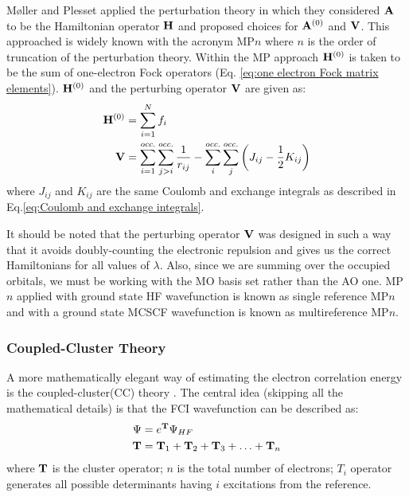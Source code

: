                 M\o{}ller and Plesset \cite{Moller1934} applied the perturbation theory in which they considered ${\mathbf {A}}$ to be the Hamiltonian operator ${\mathbf {H}}$ and proposed choices for ${\mathbf {A}}^{(0)}$ and ${\mathbf {V}}$. This approached is widely known with the acronym MP$n$ where $n$ is the order of truncation of the perturbation theory. Within the MP approach ${\mathbf {H}}^{(0)}$ is taken to be the sum of one-electron Fock operators (Eq. \eqref{eq:one electron Fock matrix elements}). ${\mathbf {H}}^{(0)}$ and the perturbing operator ${\mathbf {V}}$ are given as:
                \begin{equation}\label{eq:MP elements}
                    \begin{aligned}
                        {\mathbf {H}}^{(0)} &= \displaystyle\sum_{i=1}^N f_i\\
                        {\mathbf {V}} &= \displaystyle\sum_{i=1}^{occ.} \displaystyle\sum_{j > i}^{occ.} \frac{1}{r_{ij}} - \displaystyle\sum_{i}^{occ.} \displaystyle\sum_{j}^{occ.} \left (J_{ij} - \frac{1}{2} K_{ij} \right)
                    \end{aligned}
                \end{equation}
                where $J_{ij}$ and $K_{ij}$ are the same Coulomb and exchange integrals as described in Eq.\eqref{eq:Coulomb and exchange integrals}.

                It should be noted that the perturbing operator ${\mathbf {V}}$ was designed in such a way that it avoids doubly-counting the electronic repulsion and gives us the correct Hamiltonians for all values of $\lambda$. Also, since we are summing over the occupied orbitals, we must be working with the MO basis set rather than the AO one. MP$n$ applied with ground state HF wavefunction is known as single reference MP$n$ and with a ground state MCSCF wavefunction is known as multireference MP$n$.

            \subsubsection{Coupled-Cluster Theory}\label{subsubsec:coupled-cluster theory}
                A more mathematically elegant way of estimating the electron correlation energy is the coupled-cluster(CC) theory \cite{Cizek1966}. The central idea (skipping all the mathematical details) is that the FCI wavefunction can be described as:
                \begin{equation}\label{eq:cc}
                    \begin{aligned}
                        \Psi &= e^{\mathbf {T}} \Psi_{HF}\\
                        {\mathbf {T}} &= {\mathbf {T}}_1 + {\mathbf {T}}_2 + {\mathbf {T}}_3 + \ldots + {\mathbf {T}}_n
                    \end{aligned}
                \end{equation}
                where ${\mathbf {T}}$ is the cluster operator; $n$ is the total number of electrons; $T_i$ operator generates all possible determinants having $i$ excitations from the reference.

